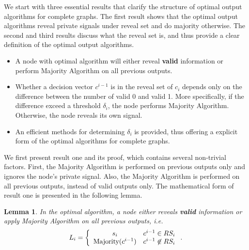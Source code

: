 \documentclass[a4paper,UKenglish]{lipics}
\newtheorem{lem}[thm]{Lemma}
\theoremstyle{definition}
\begin{document}
We start with three essential results that clarify the structure of optimal output algorithms for complete graphs.
The first result shows that the optimal output algorithms reveal private signals under reveal set and do majority otherwise.
The second and third results discuss what the reveal set is, and thus provide a clear definition of the optimal output algorithms.
\begin{itemize}
\item A node with optimal algorithm will either reveal \textbf{valid} information or perform Majority Algorithm on all previous outputs.
\item Whether a decision vector $c^{i-1}$ is in the reveal set of $c_i$ depends only on the difference between the number of valid 0 and valid 1.
	More specifically, if the difference exceed a threshold $\delta_i$, the node performs Majority Algorithm.
	Otherwise, the node reveals its own signal.
\item An efficient methods for determining $\delta_i$ is provided, thus offering a explicit form of the optimal algorithms for complete graphs.
\end{itemize}

We first present result one and its proof,
	which contains several non-trivial factors.
First, the Majority Algorithm is performed on previous outputs only and ignores the node's private signal.
Also, the Majority Algorithm is performed on all previous outputs, instead of valid outputs only.
The mathematical form of result one is presented in the following lemma.
\begin{lem}
\label{lem:reveal or majority}
In the optimal algorithm, a node either reveals \textbf{valid} information or apply Majority Algorithm on all previous outputs, i.e.
\begin{equation*}
L_i 
= \left\{ 
	\begin{array}{c l}
		s_i & c^{i-1} \in RS_i \\
 		\text{Majority}(c^{i-1}) & c^{i-1} \not \in RS_i
 	\end{array}
\right..
\end{equation*}
\end{lem}
\end{document}
